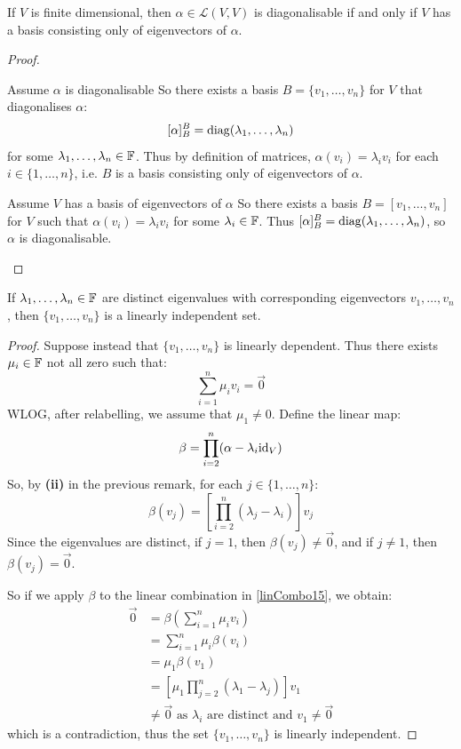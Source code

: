 \documentclass[../main.tex]{subfiles}
\begin{document}
\begin{lemma}
  If $V$ is finite dimensional, then $\alpha \in \mathcal{L}(V, V)$ is diagonalisable if and only if $V$ has a basis consisting only of eigenvectors of $\alpha$. \label{diagEigenbasis}
\end{lemma}
\begin{proof}
  \begin{proofdirection}{Assume $\alpha$ is diagonalisable}
    So there exists a basis $B = \{v_1, \ldots, v_n\}$ for $V$ that diagonalises $\alpha$:
    \[
      [\alpha]^{B}_{B} = \operatorname{diag}(\lambda_1, \ldots, \lambda_n)
    \]
    for some $\lambda_1, \ldots, \lambda_n \in \mathbb{F}$.
    Thus by definition of matrices, $\alpha(v_i) = \lambda_i v_i$ for each $i \in \{1, \ldots, n\}$, i.e. $B$ is a basis consisting only of eigenvectors of $\alpha$.
  \end{proofdirection}
  \begin{proofdirection}{Assume $V$ has a basis of eigenvectors of $\alpha$}
    So there exists a basis $B = [v_1, \ldots, v_n]$ for $V$ such that $\alpha(v_i) = \lambda_i v_i$ for some $\lambda_i \in \mathbb{F}$.
    Thus $[\alpha]^{B}_{B} = \operatorname{diag}(\lambda_1, \ldots, \lambda_n)$, so $\alpha$ is diagonalisable.
  \end{proofdirection}
\end{proof}
\begin{lemma}
  If $\lambda_1, \ldots, \lambda_n \in \mathbb{F}$ are distinct eigenvalues with corresponding eigenvectors $v_1, \ldots, v_n$, then $\{v_1, \ldots, v_n\}$ is a linearly independent set. \label{eLI}
\end{lemma}
\begin{proof}
  Suppose instead that $\{v_1, \ldots, v_n\}$ is linearly dependent.
  Thus there exists $\mu_i \in \mathbb{F}$ not all zero such that:
  \begin{equation}
    \sum_{i = 1}^{n} \mu_i v_i = \vec{0} \label{linComboL15} \tag{\dag}
  \end{equation}
  WLOG, after relabelling, we assume that $\mu_1 \neq 0$.
  Define the linear map:
  \[
    \beta = \prod_{i = 2}^{n} (\alpha - \lambda_{i} \mathrm{id}_V)
  \]
  So, by \textbf{(ii)} in the previous remark, for each $j \in \{1, \ldots, n\}$:
  \[
    \beta(v_j) = \left[\prod_{i = 2}^{n} (\lambda_j - \lambda_i)\right] v_j
  \]
  Since the eigenvalues are distinct, if $j = 1$, then $\beta(v_j) \neq \vec{0}$, and if $j \neq 1$, then $\beta(v_j) = \vec{0}$.

  So if we apply $\beta$ to the linear combination in \cref{linCombo15}, we obtain:
  \begin{align*}
    \vec{0} &= \beta\left(\sum_{i = 1}^{n} \mu_i v_i\right) \\
            &= \sum_{i = 1}^{n} \mu_i \beta(v_i) \\
            &= \mu_1 \beta(v_1) \\
            &= \left[\mu_1 \prod_{j = 2}^{n} (\lambda_1 - \lambda_j)\right] v_1 \\
            &\neq \vec{0} \text{ as $\lambda_i$ are distinct and $v_1 \neq \vec{0}$}
  \end{align*}
  which is a contradiction, thus the set $\{v_1, \ldots, v_n\}$ is linearly independent.
\end{proof}
\end{document}
